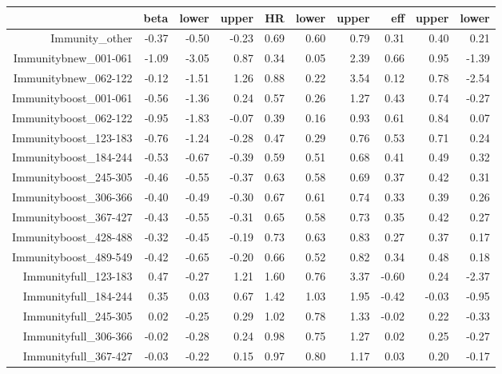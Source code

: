\begin{table}[ht]
\centering
\begin{tabular}{rrrrrrrrrr}
  \hline
 & beta & lower & upper & HR & lower & upper & eff & upper & lower \\ 
  \hline
Immunity\_other & -0.37 & -0.50 & -0.23 & 0.69 & 0.60 & 0.79 & 0.31 & 0.40 & 0.21 \\ 
  Immunitybnew\_001-061 & -1.09 & -3.05 & 0.87 & 0.34 & 0.05 & 2.39 & 0.66 & 0.95 & -1.39 \\ 
  Immunitybnew\_062-122 & -0.12 & -1.51 & 1.26 & 0.88 & 0.22 & 3.54 & 0.12 & 0.78 & -2.54 \\ 
  Immunityboost\_001-061 & -0.56 & -1.36 & 0.24 & 0.57 & 0.26 & 1.27 & 0.43 & 0.74 & -0.27 \\ 
  Immunityboost\_062-122 & -0.95 & -1.83 & -0.07 & 0.39 & 0.16 & 0.93 & 0.61 & 0.84 & 0.07 \\ 
  Immunityboost\_123-183 & -0.76 & -1.24 & -0.28 & 0.47 & 0.29 & 0.76 & 0.53 & 0.71 & 0.24 \\ 
  Immunityboost\_184-244 & -0.53 & -0.67 & -0.39 & 0.59 & 0.51 & 0.68 & 0.41 & 0.49 & 0.32 \\ 
  Immunityboost\_245-305 & -0.46 & -0.55 & -0.37 & 0.63 & 0.58 & 0.69 & 0.37 & 0.42 & 0.31 \\ 
  Immunityboost\_306-366 & -0.40 & -0.49 & -0.30 & 0.67 & 0.61 & 0.74 & 0.33 & 0.39 & 0.26 \\ 
  Immunityboost\_367-427 & -0.43 & -0.55 & -0.31 & 0.65 & 0.58 & 0.73 & 0.35 & 0.42 & 0.27 \\ 
  Immunityboost\_428-488 & -0.32 & -0.45 & -0.19 & 0.73 & 0.63 & 0.83 & 0.27 & 0.37 & 0.17 \\ 
  Immunityboost\_489-549 & -0.42 & -0.65 & -0.20 & 0.66 & 0.52 & 0.82 & 0.34 & 0.48 & 0.18 \\ 
  Immunityfull\_123-183 & 0.47 & -0.27 & 1.21 & 1.60 & 0.76 & 3.37 & -0.60 & 0.24 & -2.37 \\ 
  Immunityfull\_184-244 & 0.35 & 0.03 & 0.67 & 1.42 & 1.03 & 1.95 & -0.42 & -0.03 & -0.95 \\ 
  Immunityfull\_245-305 & 0.02 & -0.25 & 0.29 & 1.02 & 0.78 & 1.33 & -0.02 & 0.22 & -0.33 \\ 
  Immunityfull\_306-366 & -0.02 & -0.28 & 0.24 & 0.98 & 0.75 & 1.27 & 0.02 & 0.25 & -0.27 \\ 
  Immunityfull\_367-427 & -0.03 & -0.22 & 0.15 & 0.97 & 0.80 & 1.17 & 0.03 & 0.20 & -0.17 \\ 

\end{tabular}
\end{table}
